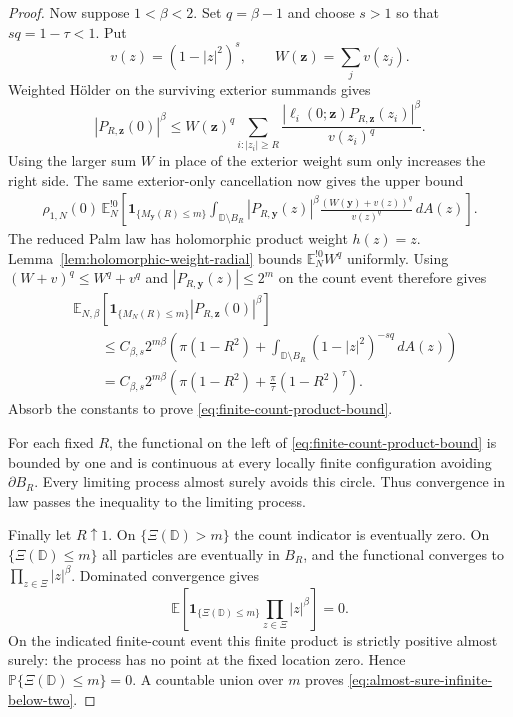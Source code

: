 \documentclass[11pt,a4paper]{article}
\numberwithin{equation}{section}
\theoremstyle{definition}
\theoremstyle{remark}
\newcommand{\D}{\mathbb D}
\begin{document}
\begin{proof}
Now suppose $1<\beta<2$. Set $q=\beta-1$ and choose $s>1$ so
that $sq=1-\tau<1$. Put
\[
 v(z)=(1-|z|^2)^s,\qquad W(\mathbf z)=\sum_jv(z_j).
\]
Weighted H\"older on the surviving exterior summands gives
\[
 |P_{R,\mathbf z}(0)|^\beta
 \le W(\mathbf z)^q
 \sum_{i:|z_i|\ge R}
 \frac{|\ell_i(0;\mathbf z)P_{R,\mathbf z}(z_i)|^\beta}
      {v(z_i)^q}.
\]
Using the larger sum $W$ in place of the exterior weight sum only
increases the right side. The same exterior-only cancellation now
gives the upper bound
\begin{align*}
 \rho_{1,N}(0)\,
 \mathbb E_N^{!0}\left[
 \mathbf1_{\{M_{\mathbf y}(R)\le m\}}
 \int_{\D\setminus B_R}|P_{R,\mathbf y}(z)|^\beta
    \frac{(W(\mathbf y)+v(z))^q}{v(z)^q}\,dA(z)\right].
\end{align*}
The reduced Palm law has holomorphic product weight $h(z)=z$.
Lemma~\ref{lem:holomorphic-weight-radial} bounds
$\mathbb E_N^{!0}W^q$ uniformly. Using
$(W+v)^q\le W^q+v^q$ and $|P_{R,\mathbf y}(z)|\le2^m$ on the
count event therefore gives
\begin{align*}
 &\mathbb E_{N,\beta}
 \left[\mathbf1_{\{M_N(R)\le m\}}
                         |P_{R,\mathbf z}(0)|^\beta\right]\\
 &\qquad\le C_{\beta,s}2^{m\beta}
 \left(\pi(1-R^2)+
               \int_{\D\setminus B_R}(1-|z|^2)^{-sq}\,dA(z)\right)\\
 &\qquad=C_{\beta,s}2^{m\beta}
 \left(\pi(1-R^2)+\frac\pi\tau(1-R^2)^\tau\right).
\end{align*}
Absorb the constants to prove
\eqref{eq:finite-count-product-bound}.

For each fixed $R$, the functional on the left of
\eqref{eq:finite-count-product-bound} is bounded by one and is
continuous at every locally finite configuration avoiding
$\partial B_R$. Every limiting process almost surely avoids this
circle. Thus convergence in law passes the inequality to the
limiting process.

Finally let $R\uparrow1$. On $\{\Xi(\D)>m\}$ the count
indicator is eventually zero. On $\{\Xi(\D)\le m\}$ all
particles are eventually in $B_R$, and the functional converges
to $\prod_{z\in\Xi}|z|^\beta$. Dominated convergence gives
\[
 \mathbb E\left[
 \mathbf1_{\{\Xi(\D)\le m\}}\prod_{z\in\Xi}|z|^\beta\right]=0.
\]
On the indicated finite-count event this finite product is
strictly positive almost surely: the process has no point at the
fixed location zero. Hence $\mathbb P\{\Xi(\D)\le m\}=0$.
A countable union over $m$ proves
\eqref{eq:almost-sure-infinite-below-two}.
\end{proof}
\end{document}
